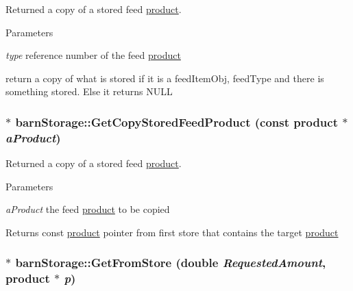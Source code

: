 Returned a copy of a stored feed \hyperlink{classproduct}{product}. 
\begin{DoxyParams}{Parameters}
\item[{\em type}]reference number of the feed \hyperlink{classproduct}{product}\end{DoxyParams}
return a copy of what is stored if it is a feedItemObj, feedType and there is something stored. Else it returns NULL \hypertarget{classbarn_storage_aecf6b68a80f1e0f0b8f2f8d9eaed63d1}{
\subsubsection[{GetCopyStoredFeedProduct}]{ $\ast$ barnStorage::GetCopyStoredFeedProduct (const {\bf product} $\ast$ {\em aProduct})}}
\label{classbarn_storage_aecf6b68a80f1e0f0b8f2f8d9eaed63d1}


Returned a copy of a stored feed \hyperlink{classproduct}{product}. 
\begin{DoxyParams}{Parameters}
\item[{\em aProduct}]the feed \hyperlink{classproduct}{product} to be copied\end{DoxyParams}
Returns const \hyperlink{classproduct}{product} pointer from first store that contains the target \hyperlink{classproduct}{product} \hypertarget{classbarn_storage_a95bcaa3c5e29432ec990578e100f36d3}{
\subsubsection[{GetFromStore}]{ $\ast$ barnStorage::GetFromStore (double {\em RequestedAmount}, \/  {\bf product} $\ast$ {\em p})}}
\label{classbarn_storage_a95bcaa3c5e29432ec990578e100f36d3}


